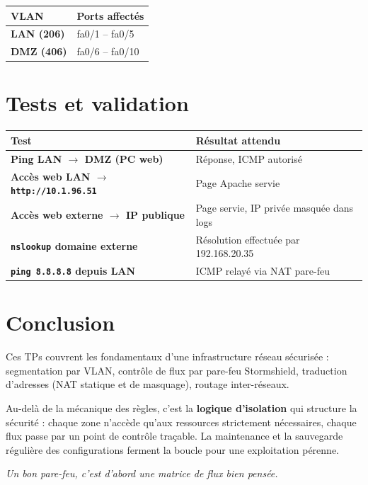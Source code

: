 \documentclass[11pt,a4paper]{article}
\begin{document}
\begin{tabularx}{\linewidth}{@{}>{\bfseries}l X@{}}
\toprule
\rowcolor{light} VLAN & Ports affectés \\ \midrule
LAN (206) & fa0/1 -- fa0/5 \\
DMZ (406) & fa0/6 -- fa0/10 \\
\bottomrule
\end{tabularx}

\section{Tests et validation}

\renewcommand{\arraystretch}{1.4}
\begin{tabularx}{\linewidth}{@{}>{\bfseries}p{4.2cm} X@{}}
\toprule
\rowcolor{light} Test & Résultat attendu \\ \midrule
Ping LAN $\rightarrow$ DMZ (PC web)        & Réponse, ICMP autorisé \\
Accès web LAN $\rightarrow$ \texttt{http://10.1.96.51} & Page Apache servie \\
Accès web externe $\rightarrow$ IP publique  & Page servie, IP privée masquée dans logs \\
\texttt{nslookup} domaine externe          & Résolution effectuée par 192.168.20.35 \\
\texttt{ping 8.8.8.8} depuis LAN           & ICMP relayé via NAT pare-feu \\
\bottomrule
\end{tabularx}

\section{Conclusion}

Ces TPs couvrent les fondamentaux d'une infrastructure réseau sécurisée : segmentation par VLAN, contrôle de flux par pare-feu Stormshield, traduction d'adresses (NAT statique et de masquage), routage inter-réseaux.

\medskip
Au-delà de la mécanique des règles, c'est la \textbf{logique d'isolation} qui structure la sécurité : chaque zone n'accède qu'aux ressources strictement nécessaires, chaque flux passe par un point de contrôle traçable. La maintenance et la sauvegarde régulière des configurations ferment la boucle pour une exploitation pérenne.

\vspace{0.5cm}
\begin{center}
{\sffamily\itshape\color{midgray}\large
\og Un bon pare-feu, c'est d'abord une matrice de flux bien pensée. \fg{}}
\end{center}
\end{document}
